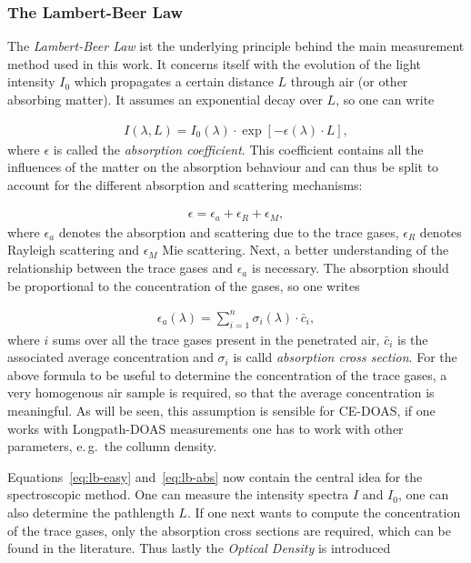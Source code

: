 \subsubsection{The Lambert-Beer Law}
\label{sec:lambert-beer}

The \emph{Lambert-Beer Law} ist the underlying principle behind the
main measurement method used in this work. It concerns itself with the
evolution of the light intensity $I_0$ which propagates a certain
distance $L$ through air (or other absorbing matter). It assumes an
exponential decay over $L$, so one can write

\begin{align}
  I(\lambda, L) = I_0(\lambda) \cdot \exp[-\epsilon(\lambda) \cdot
  L], \label{eq:lb-easy}
\end{align}
where $\epsilon$ is called the \emph{absorption coefficient}. This
coefficient contains all the influences of the matter on the
absorption behaviour and can thus be split to account for the different
absorption and scattering mechanisms:

\begin{align*}
  \epsilon = \epsilon_a + \epsilon_R + \epsilon_M,
\end{align*}
where $\epsilon_a$ denotes the absorption and scattering due to the
trace gases, $\epsilon_R$ denotes Rayleigh scattering and $\epsilon_M$
Mie scattering. Next, a better understanding of the relationship
between the trace gases and $\epsilon_a$ is necessary. The absorption
should be proportional to the concentration of the gases, so one
writes

\begin{align}
  \epsilon_a(\lambda) = \sum_{i=1}^n \sigma_i(\lambda) \cdot \bar c_i, \label{eq:lb-abs}
\end{align}
where $i$ sums over all the trace gases present in the penetrated air,
$\bar c_i$ is the associated average concentration and $\sigma_i$ is
calld \emph{absorption cross section}. For the above formula to be
useful to determine the concentration of the trace gases, a very
homogenous air sample is required, so that the average concentration
is meaningful. As will be seen, this assumption is sensible for
CE-DOAS, if one works with Longpath-DOAS measurements one has to work
with other parameters, e.\,g.\ the collumn density.

Equations~\eqref{eq:lb-easy} and~\eqref{eq:lb-abs} now contain the
central idea for the spectroscopic method. One can measure the
intensity spectra $I$ and $I_0$, one can also determine the pathlength
$L$. If one next wants to compute the concentration of the trace gases,
only the absorption cross sections are required, which can be found in the
literature. Thus lastly the \emph{Optical Density} is introduced

